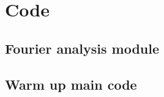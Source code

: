 \documentclass[twocolumn]{myarticle}
\begin{document}
\section{Code}
\label{sec:code}

\subsection{Fourier analysis module}
\label{subsec:fourier_analysis_module}


\vspace{10pt}

\subsection{Warm up main code}
\label{subsec:warm_up_main_code}


\vspace{10pt}
\end{document}
